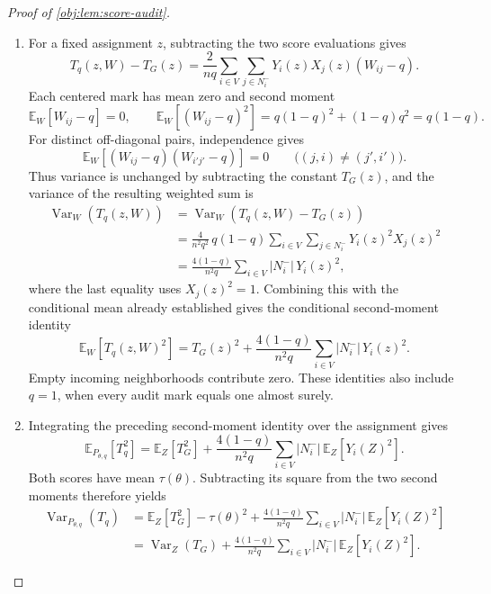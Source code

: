 \documentclass[11pt]{article}
\begin{document}
\begin{proof}[Proof of \cref{obj:lem:score-audit}]
\begin{enumerate}
\item For a fixed assignment \(z\), subtracting the two score evaluations gives
\[
T_q(z,W)-T_G(z)
=
\frac{2}{nq}\sum_{i\in V}\sum_{j\in N_i^-}
Y_i(z)X_j(z)(W_{ij}-q).
\]
Each centered mark has mean zero and second moment
\[
\mathbb E_W[W_{ij}-q]=0,
\qquad
\mathbb E_W[(W_{ij}-q)^2]
=q(1-q)^2+(1-q)q^2
=q(1-q).
\]
For distinct off-diagonal pairs, independence gives
\[
\mathbb E_W[(W_{ij}-q)(W_{i'j'}-q)]=0
\qquad\bigl((j,i)\ne(j',i')\bigr).
\]
Thus variance is unchanged by subtracting the constant \(T_G(z)\), and the variance of the resulting weighted sum is
\[
\begin{aligned}
\operatorname{Var}_W(T_q(z,W))
&=\operatorname{Var}_W(T_q(z,W)-T_G(z))\\
&=\frac{4}{n^2q^2}\,q(1-q)
 \sum_{i\in V}\sum_{j\in N_i^-}Y_i(z)^2X_j(z)^2\\
&=\frac{4(1-q)}{n^2q}
 \sum_{i\in V}|N_i^-|\,Y_i(z)^2,
\end{aligned}
\]
where the last equality uses \(X_j(z)^2=1\). Combining this with the conditional mean already established gives the conditional second-moment identity
\[
\mathbb E_W[T_q(z,W)^2]
=
T_G(z)^2
+\frac{4(1-q)}{n^2q}
 \sum_{i\in V}|N_i^-|\,Y_i(z)^2.
\]
Empty incoming neighborhoods contribute zero. These identities also include \(q=1\), when every audit mark equals one almost surely.

\item Integrating the preceding second-moment identity over the assignment gives
\[
\mathbb E_{P_{\theta,q}}[T_q^2]
=
\mathbb E_Z[T_G^2]
+\frac{4(1-q)}{n^2q}
 \sum_{i\in V}|N_i^-|\,\mathbb E_Z[Y_i(Z)^2].
\]
Both scores have mean \(\tau(\theta)\). Subtracting its square from the two second moments therefore yields
\[
\begin{aligned}
\operatorname{Var}_{P_{\theta,q}}(T_q)
&=\mathbb E_Z[T_G^2]-\tau(\theta)^2
 +\frac{4(1-q)}{n^2q}
  \sum_{i\in V}|N_i^-|\,\mathbb E_Z[Y_i(Z)^2]\\
&=\operatorname{Var}_Z(T_G)
 +\frac{4(1-q)}{n^2q}
  \sum_{i\in V}|N_i^-|\,\mathbb E_Z[Y_i(Z)^2].
\end{aligned}
\]


\end{enumerate}
\end{proof}
\end{document}
